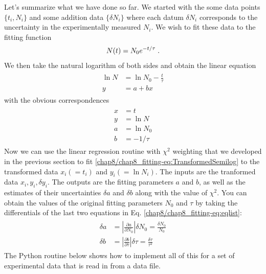 \documentclass[letterpaper,10pt,english]{sphinxmanual}
\begin{document}
Let's summarize what we have done so far.  We started with the some data points \(\{t_i,N_i\}\) and some addition data \(\{\delta N_i\}\) where each datum \(\delta N_i\) corresponds to the uncertainty in the experimentally measured \(N_i\).  We wish to fit these data to the fitting function
\begin{gather}
\begin{split}N(t) = N_0 e^{-t/\tau} \;.\end{split}\notag
\end{gather}
We then take the natural logarithm of both sides and obtain the linear equation
\label{chap8/chap8_fitting:equation-eq:TransformedSemilog}\begin{gather}
\begin{split}\ln N &= \ln N_{0} -\frac{t}{\tau} \\
y &= a + bx\end{split}\label{chap8/chap8_fitting-eq:TransformedSemilog}
\end{gather}
with the obvious correspondences
\label{chap8/chap8_fitting:equation-eq:eqlist}\begin{gather}
\begin{split}x &= t\\
y &= \ln N\\
a &= \ln N_{0}\\
b &= -1/\tau\end{split}\label{chap8/chap8_fitting-eq:eqlist}
\end{gather}
Now we can use the linear regression routine with \(\chi^2\) weighting that we developed in the previous section to fit  \eqref{chap8/chap8_fitting-eq:TransformedSemilog} to the transformed data \(x_i (= t_i)\) and  \(y_i (= \ln N_i)\).  The inputs are the tranformed data \({x_i}, {y_i}, {\delta y_i}\).  The outputs are the fitting parameters \(a\) and \(b\), as well as the estimates of their uncertainties \(\delta a\) and \(\delta b\) along with the value of \(\chi^2\).  You can obtain the values of the original fitting parameters \(N_0\) and \(\tau\) by taking the differentials of the last two equations in Eq. \eqref{chap8/chap8_fitting-eq:eqlist}:
\label{chap8/chap8_fitting:equation-eq:paramunc}\begin{gather}
\begin{split}\delta a &= \left|\frac{\partial a}{\partial N_0}\right|\delta N_0
          = \frac{\delta N_{0}}{N_{0}}\\
\delta b &= \left|\frac{\partial b}{\partial \tau}\right|\delta \tau
          = \frac{\delta \tau}{\tau^2}\end{split}\label{chap8/chap8_fitting-eq:paramunc}
\end{gather}
The Python routine below shows how to implement all of this for a set of experimental data that is read in from a data file.
\end{document}
